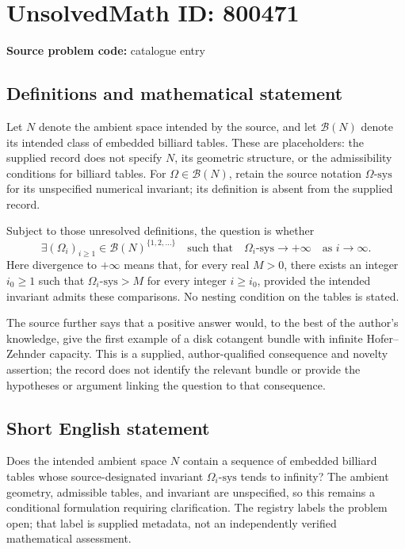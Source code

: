 \documentclass[11pt]{article}
\begin{document}
\section*{UnsolvedMath ID: 800471}
\textbf{Source problem code:} catalogue entry
\subsection{Definitions and mathematical statement}
Let \(N\) denote the ambient space intended by the source, and let \(\mathcal B(N)\) denote its intended class of embedded billiard tables. These are placeholders: the supplied record does not specify \(N\), its geometric structure, or the admissibility conditions for billiard tables. For \(\Omega\in\mathcal B(N)\), retain the source notation \(\Omega\text{-}\mathrm{sys}\) for its unspecified numerical invariant; its definition is absent from the supplied record.

Subject to those unresolved definitions, the question is whether
\[
\exists (\Omega_i)_{i\geq 1}\in\mathcal B(N)^{\{1,2,\ldots\}}
\quad\text{such that}\quad
\Omega_i\text{-}\mathrm{sys}\longrightarrow+\infty
\quad\text{as }i\to\infty.
\]
Here divergence to \(+\infty\) means that, for every real \(M>0\), there exists an integer \(i_0\geq1\) such that \(\Omega_i\text{-}\mathrm{sys}>M\) for every integer \(i\geq i_0\), provided the intended invariant admits these comparisons. No nesting condition on the tables is stated.

The source further says that a positive answer would, to the best of the author's knowledge, give the first example of a disk cotangent bundle with infinite Hofer--Zehnder capacity. This is a supplied, author-qualified consequence and novelty assertion; the record does not identify the relevant bundle or provide the hypotheses or argument linking the question to that consequence.
\subsection{Short English statement}
Does the intended ambient space \(N\) contain a sequence of embedded billiard tables whose source-designated invariant \(\Omega_i\text{-}\mathrm{sys}\) tends to infinity? The ambient geometry, admissible tables, and invariant are unspecified, so this remains a conditional formulation requiring clarification. The registry labels the problem open; that label is supplied metadata, not an independently verified mathematical assessment.
\end{document}

